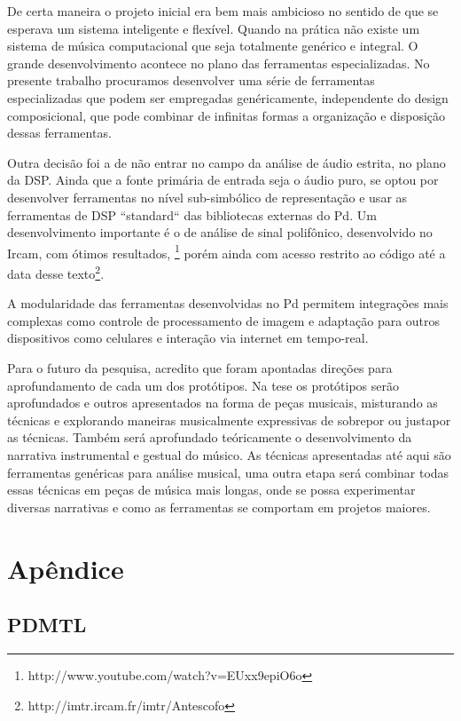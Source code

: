 \documentclass[draft]{ppgmus}
\begin{document}
De certa maneira o projeto inicial era bem mais ambicioso no sentido
de que se esperava um sistema inteligente e flexível. 
Quando na prática
não existe um sistema de música computacional que seja totalmente genérico
e integral. O grande desenvolvimento acontece no plano das ferramentas
especializadas. No presente trabalho procuramos desenvolver uma série
de ferramentas especializadas que podem ser empregadas genéricamente, independente
do design composicional, que pode combinar de infinitas formas a organização e 
disposição dessas ferramentas.  

Outra decisão foi a de não entrar no campo da análise de áudio estrita, no plano
da DSP. Ainda que a fonte primária de entrada seja o áudio puro, se optou por
desenvolver ferramentas no nível sub-simbólico de representação e usar as ferramentas
de DSP ``standard`` das bibliotecas externas do Pd. Um desenvolvimento importante
é o de análise de sinal polifônico, desenvolvido no Ircam, com ótimos resultados,
\footnote{http://www.youtube.com/watch?v=EUxx9epiO6o}
porém ainda com acesso restrito
ao código até a data desse texto\footnote{http://imtr.ircam.fr/imtr/Antescofo}.    


A modularidade das ferramentas desenvolvidas no Pd permitem
integrações mais complexas como controle de  processamento de imagem
e adaptação para outros dispositivos como celulares e interação via internet
em tempo-real.

Para o futuro da pesquisa, acredito que foram apontadas direções para aprofundamento
de cada um dos protótipos. Na tese os  protótipos serão aprofundados e 
outros apresentados na forma de peças musicais, misturando as técnicas e explorando 
maneiras musicalmente expressivas de
sobrepor ou justapor as técnicas. Também será aprofundado teóricamente o 
desenvolvimento da narrativa instrumental e gestual do músico. 
As técnicas apresentadas até aqui são ferramentas genéricas para análise musical,
uma outra etapa será combinar todas essas técnicas em peças de música mais longas,
onde se possa experimentar diversas narrativas e como as ferramentas se comportam
em projetos maiores.




 


\chapter{Apêndice}
\label{chap:anexos}


\section{PDMTL}
\label{pdmtl}
\end{document}
